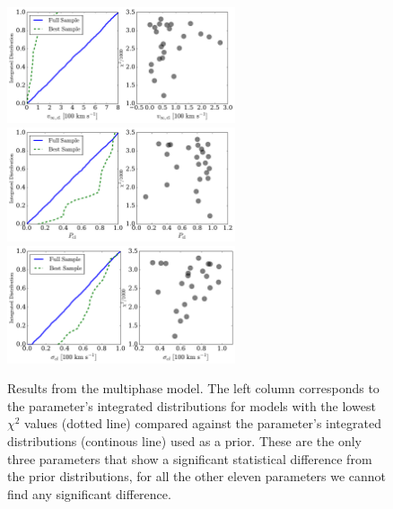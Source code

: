\documentclass[a4,useAMS,usenatbib,usegraphicx]{mn2e}
\begin{document}
\begin{figure}
\begin{center}
  \includegraphics[width=0.6\textwidth]{vinf_cl.pdf}
  \includegraphics[width=0.6\textwidth]{P_cl.pdf}
  \includegraphics[width=0.6\textwidth]{sigma_cl.pdf}
\caption{Results from the multiphase
  model\label{multiphaseresults}.
  The left column corresponds to the parameter's integrated distributions for
  models with the lowest $\chi^2$ values (dotted line) compared against the
  parameter's integrated distributions (continous line) used as a prior.
  These are the only three parameters that show a significant statistical difference from
  the prior distributions, for all the other eleven parameters we
  cannot find any significant difference.}  
\end{center}
\end{figure}
\end{document}
